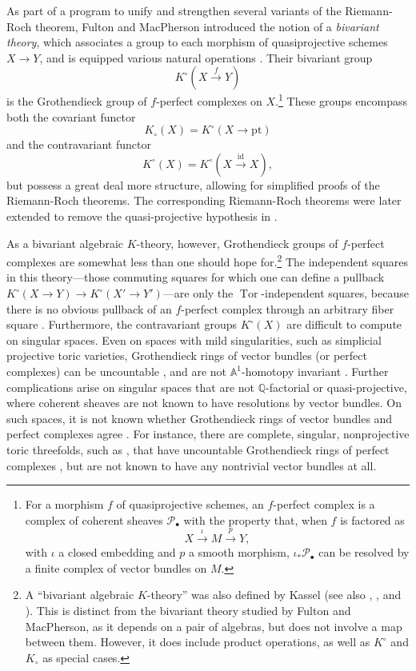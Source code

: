 \documentclass[11pt]{amsart}
\theoremstyle{definition}
\begin{document}
As part of a program to unify and strengthen several variants of the Riemann-Roch theorem, Fulton and MacPherson introduced the notion of a \emph{bivariant theory}, which associates a group to each morphism of quasiprojective schemes $X \to Y$, and is equipped various natural operations \cite{bt}.  Their bivariant group
\[
  K^\circ(X \xrightarrow{f} Y)
\]
is the Grothendieck group of $f$-perfect complexes on $X$.\footnote{For a morphism $f$ of quasiprojective schemes, an $f$-perfect complex is a complex of coherent sheaves ${\mathscr{P}}_\bullet$ with the property that, when $f$ is factored as
\[
  X \xrightarrow{\iota} M \xrightarrow{p} Y,
\]
with $\iota$ a closed embedding and $p$ a smooth morphism, $\iota_*{\mathscr{P}}_\bullet$ can be resolved by a finite complex of vector bundles on $M$.}  These groups encompass both the covariant functor
\[
  K_\circ(X) = K^\circ(X \to {\mathrm{pt}})
\]
and the contravariant functor
\[
  K^\circ(X) = K^\circ(X \xrightarrow{\mathrm{id}} X),
\]
but possess a great deal more structure, allowing for simplified proofs of the Riemann-Roch theorems.  The corresponding Riemann-Roch theorems were later extended to remove the quasi-projective hypothesis in \cite{fulton-gillet}.

As a bivariant algebraic $K$-theory, however, Grothendieck groups of $f$-perfect complexes are somewhat less than one should hope for.\footnote{A ``bivariant algebraic $K$-theory'' was also defined by Kassel \cite{kassel} (see also \cite{cuntz}, \cite{ct}, and \cite[Ex.~II.2.14]{weibel}).  This is distinct from the bivariant theory studied by Fulton and MacPherson, as it depends on a pair of algebras, but does not involve a map between them.  However, it does include product operations, as well as $K^\circ$ and $K_\circ$ as special cases.}  
The independent squares in this theory---those commuting squares for which one can define a pullback $K^\circ(X \to Y) \to K^\circ(X' \to Y')$---are only the $\operatorname{Tor}$-independent squares, because there is no obvious pullback of an $f$-perfect complex through an arbitrary fiber square \cite[Section~10.8]{bt}.  Furthermore, the contravariant groups $K^\circ(X)$ are difficult to compute on singular spaces.  Even on spaces with mild singularities, such as simplicial projective toric varieties, Grothendieck rings of vector bundles (or perfect complexes) can be uncountable \cite{gubeladze}, and are not ${\mathbb{A}}^1$-homotopy invariant \cite{chww}.  Further complications arise on singular spaces that are not ${\mathbb{Q}}$-factorial or quasi-projective, where coherent sheaves are not known to have resolutions by vector bundles.  On such spaces, it is not known whether Grothendieck rings of vector bundles and perfect complexes agree \cite{resolution}.  For instance, there are complete, singular, nonprojective toric threefolds, such as \cite[Example~4.13]{vbs}, that have uncountable Grothendieck rings of perfect complexes \cite{gharib-karu}, but are not known to have any nontrivial vector bundles at all.
\end{document}
